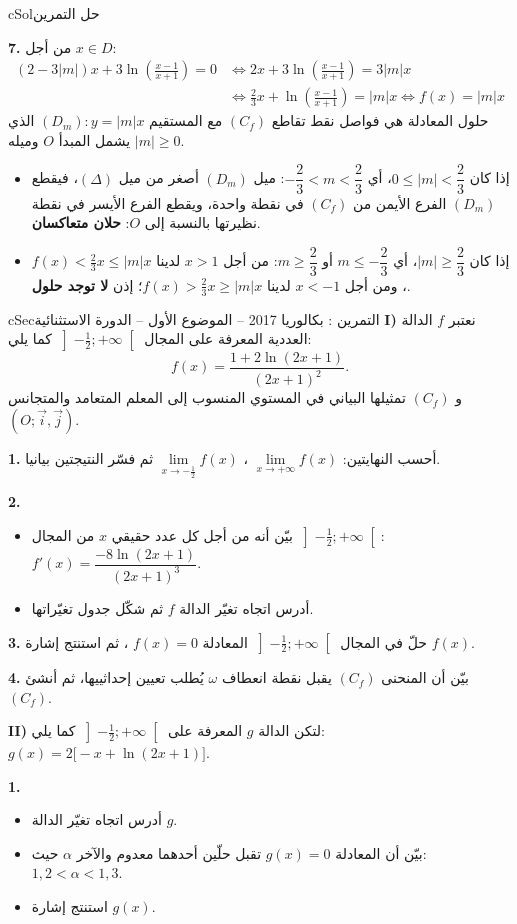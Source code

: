 \documentclass[12pt,a4paper]{article}
\newenvironment{BOX}[2]{\begin{otherlanguage}{english}\begin{arbox}{#1}{#2}}{\end{arbox}\end{otherlanguage}}
\newcounter{exo}
\newenvironment{tamrin}[1]{\stepcounter{exo}\begin{BOX}{cSec}{التمرين \theexo: #1}}{\end{BOX}}
\newenvironment{hal}{\Needspace{12\baselineskip}\begin{otherlanguage}{english}\begin{arbox}[breakable]{cSol}{حل التمرين \theexo}}{\end{arbox}\end{otherlanguage}}
\newenvironment{sq}{\begin{itemize}[leftmargin=2.4em,itemsep=3pt]}{\end{itemize}}
\newcommand{\qa}{\item[(أ)]}\newcommand{\qb}{\item[(ب)]}\newcommand{\qc}{\item[(جـ)]}\newcommand{\qd}{\item[(د)]}\newcommand{\qe}{\item[(هـ)]}
\newcommand{\QQ}[1]{\par\smallskip\textbf{#1.} }
\begin{document}
\begin{hal}
\QQ{7} من أجل $x\in D$:
\begin{align*}
(2-3|m|)x+3\ln\left(\frac{x-1}{x+1}\right)=0&\iff 2x+3\ln\left(\frac{x-1}{x+1}\right)=3|m|x\\
&\iff \frac23x+\ln\left(\frac{x-1}{x+1}\right)=|m|x\iff f(x)=|m|x
\end{align*}
حلول المعادلة هي فواصل نقط تقاطع $(C_f)$ مع المستقيم $(D_m):y=|m|x$ الذي يشمل المبدأ $O$ وميله $|m|\ge0$.
\begin{itemize}
\item إذا كان $0\le|m|<\dfrac23$، أي $-\dfrac23<m<\dfrac23$: ميل $(D_m)$ أصغر من ميل $(\Delta)$، فيقطع $(D_m)$ الفرع الأيمن من $(C_f)$ في نقطة واحدة، ويقطع الفرع الأيسر في نقطة نظيرتها بالنسبة إلى $O$: \textbf{حلان متعاكسان}.
\item إذا كان $|m|\ge\dfrac23$، أي $m\le-\dfrac23$ أو $m\ge\dfrac23$: من أجل $x>1$ لدينا $f(x)<\frac23x\le|m|x$، ومن أجل $x<-1$ لدينا $f(x)>\frac23x\ge|m|x$؛ إذن \textbf{لا توجد حلول}.
\end{itemize}
\end{hal}

\begin{tamrin}{بكالوريا 2017 -- الموضوع الأول -- الدورة الاستثنائية}
\textbf{I)} نعتبر $f$ الدالة العددية المعرفة على المجال $\left]-\frac12;+\infty\right[$ كما يلي:
\[f(x)=\frac{1+2\ln(2x+1)}{(2x+1)^2}.\]
و $(C_f)$ تمثيلها البياني في المستوي المنسوب إلى المعلم المتعامد والمتجانس $(O;\vec i,\vec j)$.
\QQ{1} أحسب النهايتين: $\lim\limits_{x\to+\infty}f(x)$ ، $\lim\limits_{x\to-\frac12}f(x)$ ثم فسّر النتيجتين بيانيا.
\QQ{2}
\begin{sq}
\qa بيّن أنه من أجل كل عدد حقيقي $x$ من المجال $\left]-\frac12;+\infty\right[$: \ $f'(x)=\dfrac{-8\ln(2x+1)}{(2x+1)^3}$.
\qb أدرس اتجاه تغيّر الدالة $f$ ثم شكّل جدول تغيّراتها.
\end{sq}
\QQ{3} حلّ في المجال $\left]-\frac12;+\infty\right[$ المعادلة $f(x)=0$ ، ثم استنتج إشارة $f(x)$.
\QQ{4} بيّن أن المنحنى $(C_f)$ يقبل نقطة انعطاف $\omega$ يُطلب تعيين إحداثييها، ثم أنشئ $(C_f)$.

\textbf{II)} لتكن الدالة $g$ المعرفة على $\left]-\frac12;+\infty\right[$ كما يلي: \ $g(x)=2\big[-x+\ln(2x+1)\big]$.
\QQ{1}
\begin{sq}
\qa أدرس اتجاه تغيّر الدالة $g$.
\qb بيّن أن المعادلة $g(x)=0$ تقبل حلّين أحدهما معدوم والآخر $\alpha$ حيث: $1{,}2<\alpha<1{,}3$.
\qc استنتج إشارة $g(x)$.
\end{sq}
\end{tamrin}
\end{document}
